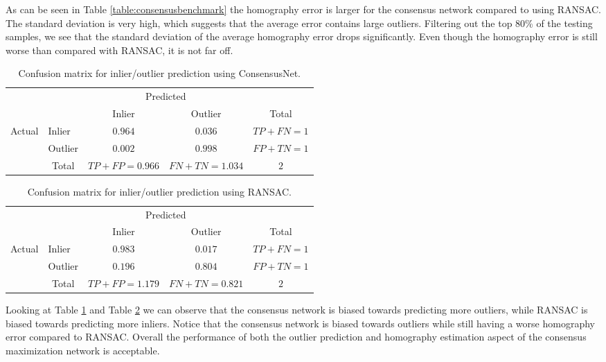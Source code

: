 As can be seen in Table \ref{table:consensusbenchmark} the homography error is larger for the consensus network compared to using RANSAC. The standard deviation is very high, which suggests that the average error contains large outliers. Filtering out the top 80\% of the testing samples, we see that the standard deviation of the average homography error drops significantly. Even though the homography error is still worse than compared with RANSAC, it is not far off.

\begin{table}[H]
\centering
\begin{tabular}{l|l|c|c|c}
	\multicolumn{2}{c}{}&\multicolumn{2}{c}{Predicted}&\\
	\cline{3-4}
	\multicolumn{2}{c|}{}&Inlier&Outlier&\multicolumn{1}{c}{Total}\\
	\cline{2-4}
	\multirow{2}{*}{Actual}& Inlier & $0.964$ & $0.036$ & $TP+FN=1$\\
	\cline{2-4}
	& Outlier & $0.002$ & $0.998$ & $FP+TN=1$\\
	\cline{2-4}
	\multicolumn{1}{c}{} & \multicolumn{1}{c}{Total} & \multicolumn{1}{c}{$TP+FP=0.966$} & \multicolumn{    1}{c}{$FN+TN=1.034$} & \multicolumn{1}{c}{$2$}\\
\end{tabular}
	\caption{Confusion matrix for inlier/outlier prediction using ConsensusNet.}
	\label{table:consensusnetconfusion}
\end{table}


\begin{table}[H]
	\centering
	\begin{tabular}{l|l|c|c|c}
		\multicolumn{2}{c}{}&\multicolumn{2}{c}{Predicted}&\\
		\cline{3-4}
		\multicolumn{2}{c|}{}&Inlier&Outlier&\multicolumn{1}{c}{Total}\\
		\cline{2-4}
		\multirow{2}{*}{Actual}& Inlier & $0.983$ & $0.017$ & $TP+FN=1$\\
		\cline{2-4}
		& Outlier & $0.196$ & $0.804$ & $FP+TN=1$\\
		\cline{2-4}
		\multicolumn{1}{c}{} & \multicolumn{1}{c}{Total} & \multicolumn{1}{c}{$TP+FP=1.179$} & \multicolumn{    1}{c}{$FN+TN=0.821$} & \multicolumn{1}{c}{$2$}\\
	\end{tabular}
	\caption{Confusion matrix for inlier/outlier prediction using RANSAC.}
	\label{table:ransacconfusion}
\end{table}

Looking at Table \ref{table:consensusnetconfusion} and Table \ref{table:ransacconfusion} we can observe that the consensus network is biased towards predicting more outliers, while RANSAC is biased towards predicting more inliers. Notice that the consensus network is biased towards outliers while still having a worse homography error compared to RANSAC. Overall the performance of both the outlier prediction and homography estimation aspect of the consensus maximization network is acceptable.


